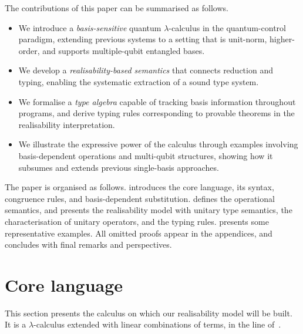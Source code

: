 \documentclass[runningheads,orivec,envcountsame,envcountsect]{llncs}
\begin{document}
The contributions of this paper can be summarised as follows.
\begin{itemize}
  \item We introduce a \emph{basis-sensitive} quantum $\lambda$-calculus in the
  quantum-control paradigm, extending previous systems to a setting that is
  unit-norm, higher-order, and supports multiple-qubit entangled bases.
\item We develop a \emph{realisability-based semantics} that connects
  reduction and typing, enabling the systematic extraction of a sound
  type system.
  \item We formalise a \emph{type algebra} capable of tracking basis
  information throughout programs, and derive typing rules corresponding to
  provable theorems in the realisability interpretation.
  \item We illustrate the expressive power of the calculus through examples
  involving basis-dependent operations and multi-qubit structures, showing how
  it subsumes and extends previous single-basis approaches.
\end{itemize}

The paper is organised as follows.  
 introduces the core language, its syntax, congruence rules,
and basis-dependent substitution.  
 defines the operational semantics, and
 presents the realisability model with unitary type semantics,
the characterisation of unitary operators, and the typing rules.  
 presents some representative examples.
All omitted proofs appear in the appendices, and
 concludes with final remarks and perspectives.

\section{Core language}\label{sec:calculus}
This section presents the calculus on which our realisability model will be
built. It is a $\lambda$-calculus extended with linear combinations of terms, in the line of~\cite{ArrighiDowekLMCS17}.
\end{document}
